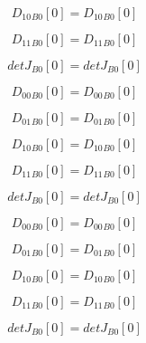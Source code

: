 \documentclass{article}
\begin{document}
\begin{dmath}{D_{10}{_{B0}}}[{0}] = {D_{10}{_{B0}}}[{0}]\end{dmath}

\begin{dmath}{D_{11}{_{B0}}}[{0}] = {D_{11}{_{B0}}}[{0}]\end{dmath}

\begin{dmath}{detJ{_{B0}}}[{0}] = {detJ{_{B0}}}[{0}]\end{dmath}

\begin{dmath}{D_{00}{_{B0}}}[{0}] = {D_{00}{_{B0}}}[{0}]\end{dmath}

\begin{dmath}{D_{01}{_{B0}}}[{0}] = {D_{01}{_{B0}}}[{0}]\end{dmath}

\begin{dmath}{D_{10}{_{B0}}}[{0}] = {D_{10}{_{B0}}}[{0}]\end{dmath}

\begin{dmath}{D_{11}{_{B0}}}[{0}] = {D_{11}{_{B0}}}[{0}]\end{dmath}

\begin{dmath}{detJ{_{B0}}}[{0}] = {detJ{_{B0}}}[{0}]\end{dmath}

\begin{dmath}{D_{00}{_{B0}}}[{0}] = {D_{00}{_{B0}}}[{0}]\end{dmath}

\begin{dmath}{D_{01}{_{B0}}}[{0}] = {D_{01}{_{B0}}}[{0}]\end{dmath}

\begin{dmath}{D_{10}{_{B0}}}[{0}] = {D_{10}{_{B0}}}[{0}]\end{dmath}

\begin{dmath}{D_{11}{_{B0}}}[{0}] = {D_{11}{_{B0}}}[{0}]\end{dmath}

\begin{dmath}{detJ{_{B0}}}[{0}] = {detJ{_{B0}}}[{0}]\end{dmath}
\end{document}
